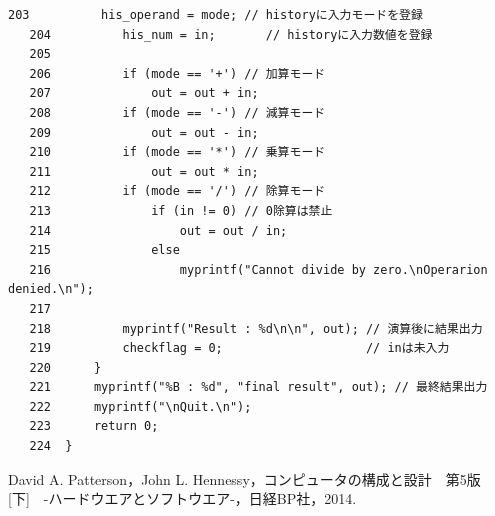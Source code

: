 \begin{Verbatim}[fontsize=\small, baselinestretch=0.8]
   203	        his_operand = mode; // historyに入力モードを登録
   204	        his_num = in;       // historyに入力数値を登録
   205	
   206	        if (mode == '+') // 加算モード
   207	            out = out + in;
   208	        if (mode == '-') // 減算モード
   209	            out = out - in;
   210	        if (mode == '*') // 乗算モード
   211	            out = out * in;
   212	        if (mode == '/') // 除算モード
   213	            if (in != 0) // 0除算は禁止
   214	                out = out / in;
   215	            else
   216	                myprintf("Cannot divide by zero.\nOperarion denied.\n");
   217	
   218	        myprintf("Result : %d\n\n", out); // 演算後に結果出力
   219	        checkflag = 0;                    // inは未入力
   220	    }
   221	    myprintf("%B : %d", "final result", out); // 最終結果出力
   222	    myprintf("\nQuit.\n");
   223	    return 0;
   224	}
\end{Verbatim}

\begin{thebibliography}{99}
   David A. Patterson，John L. Hennessy，コンピュータの構成と設計　第5版[下]　-ハードウエアとソフトウエア-，日経BP社，2014.
\end{thebibliography}


